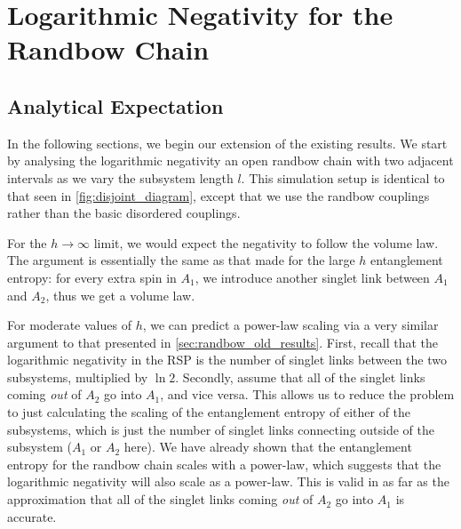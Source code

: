 \section{Logarithmic Negativity for the Randbow Chain}\label{sec:randbow_negativity_results}

\subsection{Analytical Expectation}\label{sec:randbow_old_results_negativity_analytical}
In the following sections, we begin our extension of the existing results. We start by analysing the logarithmic negativity an open randbow chain with two adjacent intervals as we vary the subsystem length $l$. This simulation setup is identical to that seen in \ref{fig:disjoint_diagram}, except that we use the randbow couplings rather than the basic disordered couplings. 

For the $h \to \infty$ limit, we would expect the negativity to follow the volume law. The argument is essentially the same as that made for the large $h$ entanglement entropy: for every extra spin in $A_1$, we introduce another singlet link between $A_1$ and $A_2$, thus we get a volume law. 

For moderate values of $h$, we can predict a power-law scaling via a very similar argument to that presented in \ref{sec:randbow_old_results}. First, recall that the logarithmic negativity in the RSP is the number of singlet links between the two subsystems, multiplied by $\ln 2$. Secondly, assume that all of the singlet links coming \textit{out} of $A_2$ go into $A_1$, and vice versa. This allows us to reduce the problem to just calculating the scaling of the entanglement entropy of either of the subsystems, which is just the number of singlet links connecting outside of the subsystem ($A_1$ or $A_2$ here). We have already shown that the entanglement entropy for the randbow chain scales with a power-law, which suggests that the logarithmic negativity will also scale as a power-law. This is valid in as far as the approximation that all of the singlet links coming \textit{out} of $A_2$ go into $A_1$ is accurate.

